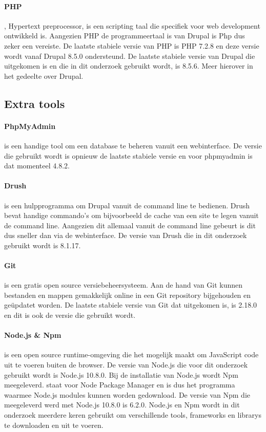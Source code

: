\paragraph{PHP}
\textcite{PHP}, Hypertext preprocessor, is een scripting taal die specifiek voor web development ontwikkeld is. Aangezien PHP de programmeertaal is van Drupal is Php dus zeker een vereiste. De laatste stabiele versie van PHP is PHP 7.2.8 en deze versie wordt vanaf Drupal 8.5.0 ondersteund. De laatste stabiele versie van Drupal die uitgekomen is en die in dit onderzoek gebruikt wordt, is 8.5.6. Meer hierover in het gedeelte over Drupal.

\subsection{Extra tools}
\paragraph{PhpMyAdmin}
\textcite{PhpMyAdmin} is een handige \gls{tool} om een database te beheren vanuit een webinterface. De versie die gebruikt wordt is opnieuw de laatste stabiele versie en voor phpmyadmin is dat momenteel 4.8.2.

\paragraph{Drush}
\textcite{Drush} is een hulpprogramma om Drupal vanuit de command line te bedienen. Drush bevat handige commando's om bijvoorbeeld de cache van een site te legen vanuit de command line. Aangezien dit allemaal vanuit de command line gebeurt is dit dus sneller dan via de webinterface. De versie van Drush die in dit onderzoek gebruikt wordt is 8.1.17.

\paragraph{Git}
\textcite{Git} is een gratis open source versiebeheersysteem. Aan de hand van Git kunnen bestanden en mappen gemakkelijk online in een Git repository bijgehouden en geüpdatet worden. De laatste stabiele versie van Git dat uitgekomen is, is 2.18.0 en dit is ook de versie die gebruikt wordt.

\paragraph{Node.js \& Npm}
\label{nodejs}
\textcite{Node} is een open source runtime-omgeving die het mogelijk maakt om JavaScript code uit te voeren buiten de browser. De versie van Node.js die voor dit onderzoek gebruikt wordt is Node.js 10.8.0. Bij de installatie van Node.js wordt Npm meegeleverd. \textcite{Npm} staat voor Node Package Manager en is dus het programma waarmee Node.js modules kunnen worden gedownload. De versie van Npm die meegeleverd werd met Node.js 10.8.0 is 6.2.0. Node.js en Npm wordt in dit onderzoek meerdere keren gebruikt om verschillende \glspl{tool}, \glspl{framework} en \glspl{library} te downloaden en uit te voeren.

